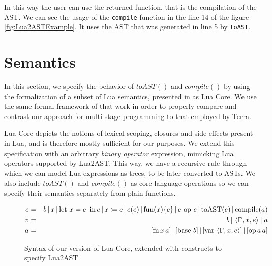 \documentclass[english]{llncs}
\begin{document}
In this way the user can use the returned function, that is the compilation of the AST.
We can see the usage of the \texttt{compile} function in the line 14 of the figure \ref{fig:Lua2ASTExample}.
It uses the AST that was generated in line 5 by \texttt{toAST}.



\section{Semantics}
\label{sec:semantics}

In this section, we specify the behavior of $toAST()$ and $compile()$
by using the formalization of a subset of Lua semantics, presented
in \cite{DeVito2013Terra} as Lua Core. We use the same formal framework
of that work in order to properly compare and contrast our approach
for multi-stage programming to that employed by Terra.

Lua Core depicts the notions of lexical scoping, closures and side-effects
present in Lua, and is therefore mostly sufficient for our purposes.
We extend this specification with an arbitrary \emph{binary operator}
expression, mimicking Lua operators supported by Lua2AST. This way,
we have a recursive rule through which we can model Lua expressions
as trees, to be later converted to ASTs. We also include $toAST()$ and
$compile()$ as core language operations so we can specify their semantics
separately from plain functions.

\begin{figure}[t]
\begin{eqnarray*}
e & = & b\,|\, x\,|\,\mbox{let \ensuremath{x=e}\,\ in\,\ensuremath{e}}\,|\, x\coloneqq e\,|\, e(e)\,|\,\mbox{fun}(x)\{e\}\,|\, e\mbox{ op }e\,|\,\mbox{toAST}(e)\,|\,\mbox{compile}(a)\\
v & = & b\,|\,\left\langle \Gamma,x,e\right\rangle \,|\, a\\
a & = & [\mbox{fn\,\ensuremath{x}\,\ensuremath{a}}]\,|\,[\mbox{base \ensuremath{b}}]\,|\,[\mbox{var}\,\left\langle \Gamma,x,e\right\rangle ]\,|\,[\mbox{op\,\ensuremath{a}\,\ensuremath{a}}]
\end{eqnarray*}
\protect\caption{\label{fig:LuaCoreSyntax}Syntax of our version of Lua Core, extended
with constructs to specify Lua2AST}
\end{figure}
\end{document}
